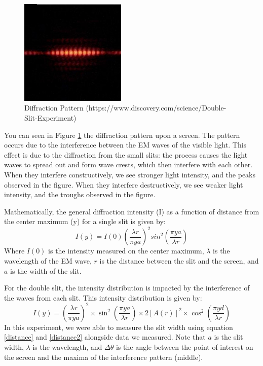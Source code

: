 \documentclass{article}[12pt]
\begin{document}
\begin{figure} [H]
  \center
  \includegraphics[width=0.45\textwidth]{figures/diffraction_pattern.jpeg}
  \caption{Diffraction Pattern (https://www.discovery.com/science/Double-Slit-Experiment)}
  \label{fig:diff_patt}
\end{figure}

You can seen in Figure \ref{fig:diff_patt} the diffraction pattern upon a screen.
The pattern occurs due to the interference between the EM waves of the visible light.
This effect is due to the diffraction from the small slits: the process causes the light waves to spread out and form wave crests, which then interfere with each other.
When they interfere constructively, we see stronger light intensity, and the peaks observed in the figure.
When they interfere destructively, we see weaker light intensity, and the troughs observed in the figure.

Mathematically, the general diffraction intensity (I) as a function of distance from the center maximum (y) for a single slit is given by:
\begin{equation}
  I(y) = I(0)( \frac{\lambda  r }{\pi y a})^2 sin^2 (\frac{\pi y a }{\lambda  r})
  \label{single_slit_intensity}
\end{equation}
Where $ I(0) $ is the intensity measured on the center maximum, $ \lambda  $ is the wavelength of the EM wave, $ r $ is the distance between the slit and the screen, and $ a $ is the width of the slit.

For the double slit, the intensity distribution is impacted by the interference of the waves from each slit.
This intensity distribution is given by:
\begin{equation}
  I(y) = (\frac{\lambda  r}{\pi y a})^2 \times \sin ^2 (\frac{\pi y a}{\lambda r}) \times 2 [A(r)]^2 \times \cos ^2(\frac{\pi y d}{\lambda  r})
  \label{double_slit_intensity}
\end{equation}
In this experiment, we were able to measure the slit width using equation \eqref{distance} and \eqref{distance2} alongside data we measured. Note that $ a $ is the slit width, $ \lambda  $ is the wavelength, and $ \Delta \theta  $ is the angle between the point of interest on the screen and the maxima of the interference pattern (middle).
\end{document}
